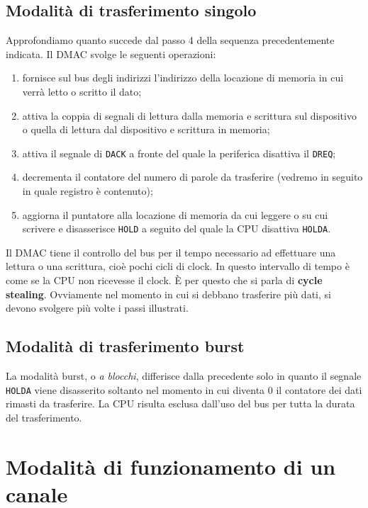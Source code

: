 \documentclass[11pt]{book}
\begin{document}
\subsection{Modalit\`a di trasferimento singolo}

Approfondiamo quanto succede dal passo 4 della sequenza
precedentemente indicata. Il DMAC svolge le seguenti operazioni:

\begin{enumerate}
\item fornisce sul bus degli indirizzi l'indirizzo della locazione di
  memoria in cui verr\`a letto o scritto il dato;
\item attiva la coppia di segnali di lettura dalla memoria e scrittura
  sul dispositivo o quella di lettura dal dispositivo e scrittura in
  memoria;
\item attiva il segnale di \texttt{DACK} a fronte del quale la
  periferica disattiva il \texttt{DREQ};
\item decrementa il contatore del numero di parole da trasferire
  (vedremo in seguito in quale registro \`e contenuto);
\item aggiorna il puntatore alla locazione di memoria da cui leggere o
  su cui scrivere e disasserisce \texttt{HOLD} a seguito del quale la
  CPU disattiva \texttt{HOLDA}.
\end{enumerate}

Il DMAC tiene il controllo del bus per il tempo necessario ad
effettuare una lettura o una scrittura, cio\`e pochi cicli di
clock. In questo intervallo di tempo \`e come se la CPU non ricevesse
il clock. \`E per questo che si parla di \textbf{cycle
  stealing}. Ovviamente nel momento in cui si debbano trasferire pi\`u
dati, si devono svolgere pi\`u volte i passi illustrati.

\subsection{Modalit\`a di trasferimento burst}

La modalit\`a burst, o \textit{a blocchi}, differisce dalla precedente
solo in quanto il segnale \texttt{HOLDA} viene disasserito soltanto
nel momento in cui diventa 0 il contatore dei dati rimasti da
trasferire. La CPU risulta esclusa dall'uso del bus per tutta la
durata del trasferimento.

\section{Modalit\`a di funzionamento di un canale}
\end{document}
